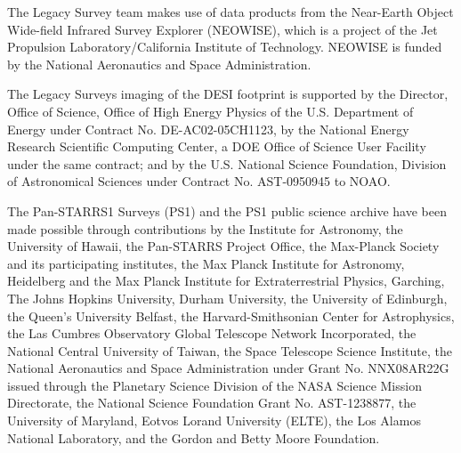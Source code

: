 \documentclass[twocolumn, linenumbers, tra]{aastex631}
\begin{document}
The Legacy Survey team makes use of data products from the Near-Earth Object Wide-field Infrared Survey Explorer (NEOWISE), which is a project of the Jet Propulsion Laboratory/California Institute of Technology. NEOWISE is funded by the National Aeronautics and Space Administration.

The Legacy Surveys imaging of the DESI footprint is supported by the Director, Office of Science, Office of High Energy Physics of the U.S. Department of Energy under Contract No. DE-AC02-05CH1123, by the National Energy Research Scientific Computing Center, a DOE Office of Science User Facility under the same contract; and by the U.S. National Science Foundation, Division of Astronomical Sciences under Contract No. AST-0950945 to NOAO.

The Pan-STARRS1 Surveys (PS1) and the PS1 public science archive have been made possible through contributions by the Institute for Astronomy, the University of Hawaii, the Pan-STARRS Project Office, the Max-Planck Society and its participating institutes, the Max Planck Institute for Astronomy, Heidelberg and the Max Planck Institute for Extraterrestrial Physics, Garching, The Johns Hopkins University, Durham University, the University of Edinburgh, the Queen's University Belfast, the Harvard-Smithsonian Center for Astrophysics, the Las Cumbres Observatory Global Telescope Network Incorporated, the National Central University of Taiwan, the Space Telescope Science Institute, the National Aeronautics and Space Administration under Grant No. NNX08AR22G issued through the Planetary Science Division of the NASA Science Mission Directorate, the National Science Foundation Grant No. AST-1238877, the University of Maryland, Eotvos Lorand University (ELTE), the Los Alamos National Laboratory, and the Gordon and Betty Moore Foundation.

\vspace{5mm}


\appendix
\end{document}
